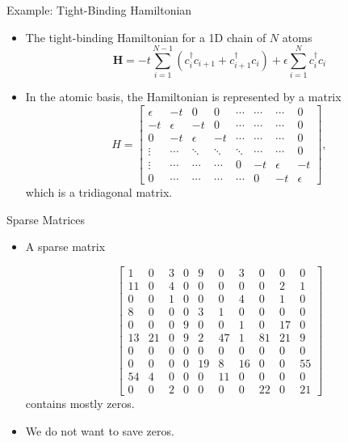 \documentclass{beamer}
\begin{document}
\begin{frame}{Example: Tight-Binding Hamiltonian}
    \begin{itemize}
        \item The tight-binding Hamiltonian for a 1D chain of $N$ atoms 
        \[
        \mathbf{H}=-t \sum_{i=1}^{N-1} \left({c}_i^{\dagger} {c}_{i+1}+{c}_{i+1}^{\dagger} {c}_i\right)+
        \epsilon \sum_{i=1}^N {c}_i^{\dagger} {c}_i
        \]
        \item In the atomic basis, the Hamiltonian is represented by a matrix
        \[  
        H=\left[\begin{array}{llllllll}
        \epsilon & -t & 0 & 0 & \cdots & \cdots & \cdots & 0 \\
        -t & \epsilon & -t & 0 & \cdots & \cdots & \cdots & 0\\
        0 & -t & \epsilon & -t & \cdots & \cdots & \cdots & 0  \\
        \vdots & \cdots & \ddots & \ddots & \ddots & \cdots & \cdots &  0 \\
        \vdots & \cdots &  \cdots & \cdots & 0 & -t & \epsilon & -t \\
        0 & \cdots& \cdots & \cdots & \cdots &  0 & -t & \epsilon   
        \end{array}\right],
        \]
        which is a tridiagonal matrix.
    \end{itemize}
\end{frame}
\begin{frame}{Sparse Matrices}
    \begin{itemize}
    \item A sparse matrix 
        
    \[\left[\begin{array}{llllllllll}
       1 & 0 & 3 & 0 & 9 & 0 & 3 & 0 & 0 & 0 \\
       11 & 0 & 4 & 0 & 0 & 0 & 0 & 0 & 2 & 1 \\
       0 & 0 & 1 & 0 & 0 & 0 & 4 & 0 & 1 & 0 \\
       8 & 0 & 0 & 0 & 3 & 1 & 0 & 0 & 0 & 0 \\
       0 & 0 & 0 & 9 & 0 & 0 & 1 & 0 & 17 & 0 \\
       13 & 21 & 0 & 9 & 2 & 47 & 1 & 81 & 21 & 9 \\
       0 & 0 & 0 & 0 & 0 & 0 & 0 & 0 & 0 & 0 \\
       0 & 0 & 0 & 0 & 19 & 8 & 16 & 0 & 0 & 55 \\
       54 & 4 & 0 & 0 & 0 & 11 & 0 & 0 & 0 & 0 \\
       0 & 0 & 2 & 0 & 0 & 0 & 0 & 22 & 0 & 21 
        \end{array}\right]
    \] contains mostly zeros.
    \item We do not want to save zeros.
\end{itemize}
\end{frame}
\end{document}

